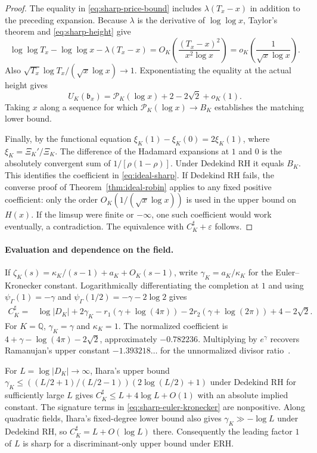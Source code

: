 \documentclass[11pt]{amsart}
\theoremstyle{definition}
\theoremstyle{remark}
\numberwithin{equation}{section}
\begin{document}
\begin{proof}
The equality in \eqref{eq:sharp-price-bound} includes
\(\lambda(T_x-x)\) in addition to the preceding expansion.
Because \(\lambda\) is the derivative of \(\log\log x\),
Taylor's theorem and \eqref{eq:sharp-height} give
\[
 \log\log T_x-\log\log x-\lambda(T_x-x)
 = O_K\!\left(\frac{(T_x-x)^2}{x^2\log x}\right)
 = o_K\!\left(\frac{1}{\sqrt{x}\log x}\right).
\]
Also \(\sqrt{T_x}\log T_x/(\sqrt{x}\log x)\to1\).
Exponentiating the equality at the actual height gives
\[
 U_K(\mathfrak b_x)=\mathcal P_K(\log x)+2-2\sqrt2+o_K(1).
\]
Taking \(x\) along a sequence for which \(\mathcal P_K(\log x)\to B_K\)
establishes the matching lower bound.

Finally, by the functional equation
\(\xi_K(1)-\xi_K(0)=2\xi_K(1)\), where
\(\xi_K=\Xi_K'/\Xi_K\).
The difference of the Hadamard expansions at \(1\) and \(0\)
is the absolutely convergent sum of \(1/[\rho(1-\rho)]\).
Under Dedekind RH it equals \(B_K\). This identifies the
coefficient in \eqref{eq:ideal-sharp}.
If Dedekind RH fails, the converse proof of Theorem~\ref{thm:ideal-robin}
applies to any fixed positive coefficient: only the order
\(O_K(1/(\sqrt{x}\log x))\) is used in the upper bound
on \(H(x)\). If the limsup were finite or \(-\infty\),
one such coefficient would work eventually, a contradiction.
The equivalence with \(C_K^\sharp+\varepsilon\) follows.
\end{proof}

\paragraph{Evaluation and dependence on the field.}
If \(\zeta_K(s)=\kappa_K/(s-1)+a_K+O_K(s-1)\), write
\(\gamma_K=a_K/\kappa_K\) for the Euler--Kronecker constant.
Logarithmically differentiating the completion at \(1\)
and using \(\psi_\Gamma(1)=-\gamma\) and
\(\psi_\Gamma(1/2)=-\gamma-2\log 2\) gives
\begin{align}
 C_K^\sharp={}&
 \log|D_K|+2\gamma_K
 -r_1(\gamma+\log(4\pi))
 -2r_2(\gamma+\log(2\pi))
 +4-2\sqrt2 .
 \label{eq:sharp-euler-kronecker}
\end{align}
For \(K=\mathbb Q\), \(\gamma_K=\gamma\) and \(\kappa_K=1\).
The normalized coefficient is \(4+\gamma-\log(4\pi)-2\sqrt2\),
approximately \(-0.782236\). Multiplying by \(e^\gamma\)
recovers Ramanujan's upper constant \(-1.393218\ldots\)
for the unnormalized divisor ratio~\cite{RamanujanNicolasRobin1997}.

For \(L=\log|D_K|\to\infty\), Ihara's upper bound
\(\gamma_K\le ((L/2+1)/(L/2-1))(2\log(L/2)+1)\)
under Dedekind RH for sufficiently large \(L\) gives
\(C_K^\sharp\le L+4\log L+O(1)\) with an absolute
implied constant. The signature terms in
\eqref{eq:sharp-euler-kronecker} are nonpositive.
Along quadratic fields, Ihara's fixed-degree lower bound
also gives \(\gamma_K\gg-\log L\) under Dedekind RH,
so \(C_K^\sharp=L+O(\log L)\) there. Consequently the
leading factor \(1\) of \(L\) is sharp for a
discriminant-only upper bound under ERH.
\cite[Section~1.6, Theorem~1 and Corollary~1 to Theorem~3]{Ihara2006}
\end{document}
